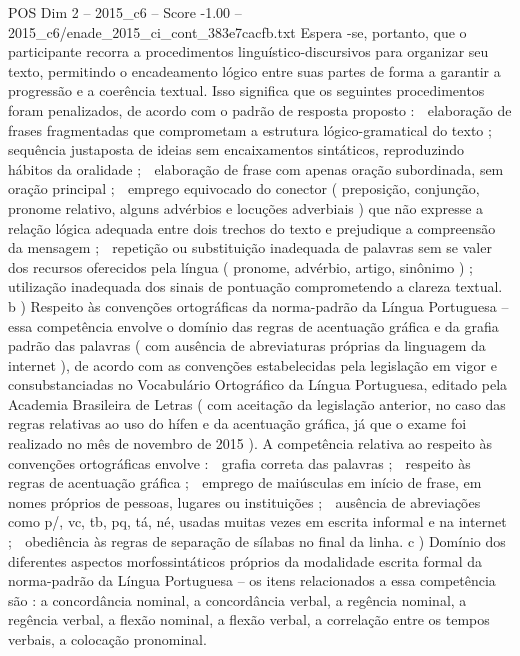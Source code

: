 \begin{textsample}{POS Dim 2 – 2015\_c6 – Score -1.00 – 2015\_c6/enade\_2015\_ci\_cont\_383e7cacfb.txt}
Espera -se, portanto, que o participante recorra a procedimentos linguístico-discursivos para organizar seu texto, permitindo o encadeamento lógico entre suas partes de forma a garantir a progressão e a coerência textual.
Isso significa que os seguintes procedimentos foram penalizados, de acordo com o padrão de resposta proposto :  elaboração de frases fragmentadas que comprometam a estrutura lógico-gramatical do texto ;  sequência justaposta de ideias sem encaixamentos sintáticos, reproduzindo hábitos da oralidade ;  elaboração de frase com apenas oração subordinada, sem oração principal ;  emprego equivocado do conector ( preposição, conjunção, pronome relativo, alguns advérbios e locuções adverbiais ) que não expresse a relação lógica adequada entre dois trechos do texto e prejudique a compreensão da mensagem ;  repetição ou substituição inadequada de palavras sem se valer dos recursos oferecidos pela língua ( pronome, advérbio, artigo, sinônimo ) ;  utilização inadequada dos sinais de pontuação comprometendo a clareza textual. b ) Respeito às convenções ortográficas da norma-padrão da Língua Portuguesa – essa competência envolve o domínio das regras de acentuação gráfica e da grafia padrão das palavras ( com ausência de abreviaturas próprias da linguagem da internet ), de acordo com as convenções estabelecidas pela legislação em vigor e consubstanciadas no Vocabulário Ortográfico da Língua Portuguesa, editado pela Academia Brasileira de Letras ( com aceitação da legislação anterior, no caso das regras relativas ao uso do hífen e da acentuação gráfica, já que o exame foi realizado no mês de novembro de 2015 ).
A competência relativa ao respeito às convenções ortográficas envolve :  grafia correta das palavras ;  respeito às regras de acentuação gráfica ;  emprego de maiúsculas em início de frase, em nomes próprios de pessoas, lugares ou instituições ;  ausência de abreviações como p/, vc, tb, pq, tá, né, usadas muitas vezes em escrita informal e na internet ;  obediência às regras de separação de sílabas no final da linha. c ) Domínio dos diferentes aspectos morfossintáticos próprios da modalidade escrita formal da norma-padrão da Língua Portuguesa – os itens relacionados a essa competência são : a concordância nominal, a concordância verbal, a regência nominal, a regência verbal, a flexão nominal, a flexão verbal, a correlação entre os tempos verbais, a colocação pronominal.

\end{textsample}
